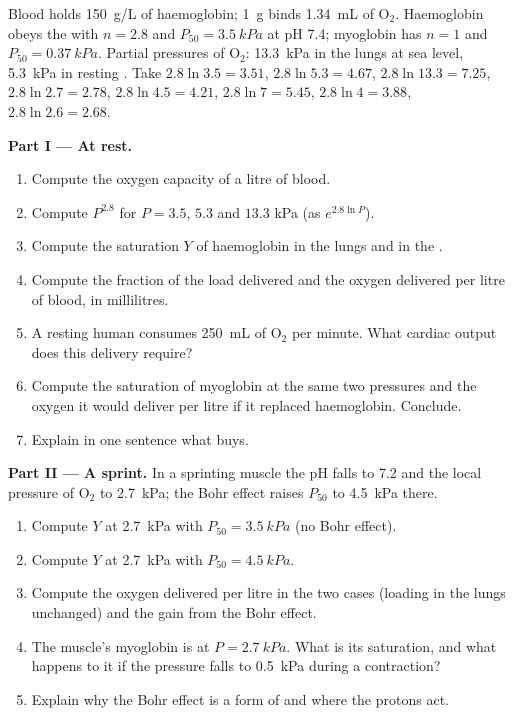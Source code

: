 \begin{problem}
\label{pb:b1:proteins:1}
Blood holds \qty{150}{g/L} of haemoglobin; \qty{1}{g} binds
\qty{1.34}{mL} of $\mathrm{O_2}$. Haemoglobin obeys the 
with $n = 2.8$ and $P_{50} = \qty{3.5}{kPa}$ at pH 7.4; myoglobin has
$n = 1$ and $P_{50} = \qty{0.37}{kPa}$. Partial pressures of
$\mathrm{O_2}$: \qty{13.3}{kPa} in the lungs at sea level,
\qty{5.3}{kPa} in resting . Take $2.8\ln 3.5 = 3.51$,
$2.8\ln 5.3 = 4.67$, $2.8\ln 13.3 = 7.25$, $2.8\ln 2.7 = 2.78$,
$2.8\ln 4.5 = 4.21$, $2.8\ln 7 = 5.45$, $2.8\ln 4 = 3.88$,
$2.8\ln 2.6 = 2.68$.

\medskip
\noindent\textbf{Part I --- At rest.}
\begin{enumerate}
  \item Compute the oxygen capacity of a litre of blood.
  \item Compute $P^{2.8}$ for $P = 3.5$, $5.3$ and $13.3$ kPa (as
        $e^{2.8\ln P}$).
  \item Compute the saturation $Y$ of haemoglobin in the lungs and in
        the .
  \item Compute the fraction of the load delivered and the oxygen
        delivered per litre of blood, in millilitres.
  \item A resting human consumes \qty{250}{mL} of $\mathrm{O_2}$ per
        minute. What cardiac output does this delivery require?
  \item Compute the saturation of myoglobin at the same two pressures
        and the oxygen it would deliver per litre if it replaced
        haemoglobin. Conclude.
  \item Explain in one sentence what  buys.
\end{enumerate}

\medskip
\noindent\textbf{Part II --- A sprint.}
In a sprinting muscle the pH falls to 7.2 and the local pressure of
$\mathrm{O_2}$ to \qty{2.7}{kPa}; the Bohr effect raises $P_{50}$ to
\qty{4.5}{kPa} there.
\begin{enumerate}[resume]
  \item Compute $Y$ at \qty{2.7}{kPa} with $P_{50} = \qty{3.5}{kPa}$
        (no Bohr effect).
  \item Compute $Y$ at \qty{2.7}{kPa} with $P_{50} = \qty{4.5}{kPa}$.
  \item Compute the oxygen delivered per litre in the two cases
        (loading in the lungs unchanged) and the gain from the Bohr
        effect.
  \item The muscle's myoglobin is at $P = \qty{2.7}{kPa}$. What is its
        saturation, and what happens to it if the pressure falls to
        \qty{0.5}{kPa} during a contraction?
  \item Explain why the Bohr effect is a form of  and where
        the protons act.
\end{enumerate}


\end{problem}
